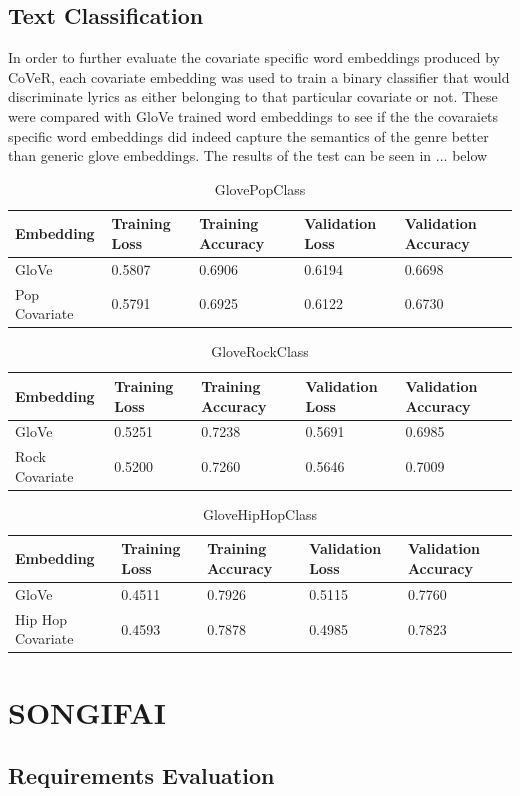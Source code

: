 \noindent
\newline


\subsection{Text Classification}
In order to further evaluate the covariate specific word embeddings produced by CoVeR, each covariate embedding was used to train a binary classifier that would discriminate lyrics as either belonging to that particular covariate or not. These were compared with GloVe trained word embeddings to see if the the covaraiets specific word embeddings did indeed capture the semantics of the genre better than generic glove embeddings. The results of the test can be seen in ... below

\begin{table}[ht]
	\centering
	\begin{tabular}{ | p{3cm} | p{2cm} | p{2cm} | p{2cm} | p{2cm} |}
		\hline
		\textbf{Embedding} & \textbf{Training Loss} & \textbf{Training Accuracy} & \textbf{Validation Loss} & \textbf{Validation Accuracy}\\ \hline
		GloVe & 0.5807 & 0.6906 & 0.6194 & 0.6698\\ \hline
		Pop Covariate & 0.5791 & 0.6925 & 0.6122 & 0.6730\\ \hline
	\end{tabular}
	\label{Tab:GlovePopClass}
	\caption{GlovePopClass}
\end{table}

\begin{table}[ht]
	\centering
	\begin{tabular}{ | p{3cm} | p{2cm} | p{2cm} | p{2cm} | p{2cm} |}
		\hline
		\textbf{Embedding} & \textbf{Training Loss} & \textbf{Training Accuracy} & \textbf{Validation Loss} & \textbf{Validation Accuracy}\\ \hline
		GloVe & 0.5251 & 0.7238 & 0.5691 & 0.6985\\ \hline
		Rock Covariate & 0.5200 & 0.7260 & 0.5646 & 0.7009\\ \hline
	\end{tabular}
	\label{Tab:GloveRockClass}
	\caption{GloveRockClass}
\end{table}

\begin{table}[ht]
	\centering
	\begin{tabular}{ | p{3cm} | p{2cm} | p{2cm} | p{2cm} | p{2cm} |}
		\hline
		\textbf{Embedding} & \textbf{Training Loss} & \textbf{Training Accuracy} & \textbf{Validation Loss} & \textbf{Validation Accuracy}\\ \hline
		GloVe & 0.4511 & 0.7926 & 0.5115 & 0.7760\\ \hline
		Hip Hop Covariate & 0.4593 & 0.7878 & 0.4985 & 0.7823\\ \hline
	\end{tabular}
	\label{Tab:GloveHipHopClass}
	\caption{GloveHipHopClass}
\end{table}
\section{SONGIFAI}
\subsection{Requirements Evaluation}
